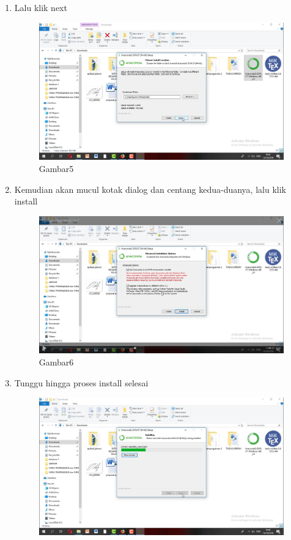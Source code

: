 \begin{enumerate}
\item Lalu klik next
\begin{figure}[h]
    \centering
    \includegraphics[scale=0.2]{gambar/cara5.png}
    \caption{Gambar5}
    \label{fig:my_label}
\end{figure}
\item Kemudian akan mucul kotak dialog dan centang kedua-duanya, lalu klik install
\begin{figure}[h]
    \centering
    \includegraphics[scale=0.2]{gambar/cara6.png}
    \caption{Gambar6}
    \label{fig:my_label}
\end{figure}
\item Tunggu hingga proses install selesai
\begin{figure}[h]
    \centering
    \includegraphics[scale=0.2]{gambar/cara7.png}

\end{figure}
\end{enumerate}
